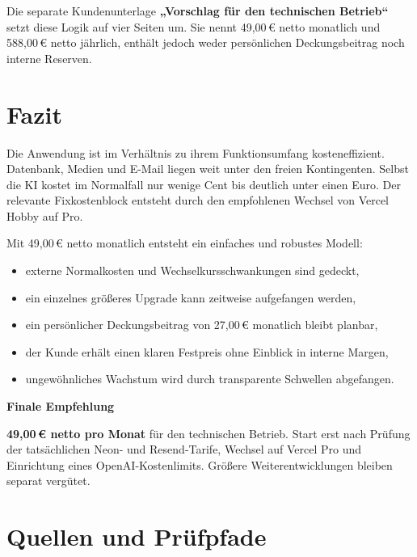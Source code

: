 \documentclass[11pt,a4paper]{article}
\newcommand{\eur}[1]{#1\,€}
\begin{document}
\begin{decisionbox}
  Die separate Kundenunterlage \textbf{„Vorschlag für den technischen Betrieb“} setzt diese Logik auf vier Seiten um. Sie nennt \eur{49,00} netto monatlich und \eur{588,00} netto jährlich, enthält jedoch weder persönlichen Deckungsbeitrag noch interne Reserven.
\end{decisionbox}

\section{Fazit}

Die Anwendung ist im Verhältnis zu ihrem Funktionsumfang kosteneffizient. Datenbank, Medien und E-Mail liegen weit unter den freien Kontingenten. Selbst die KI kostet im Normalfall nur wenige Cent bis deutlich unter einen Euro. Der relevante Fixkostenblock entsteht durch den empfohlenen Wechsel von Vercel Hobby auf Pro.

Mit \eur{49,00} netto monatlich entsteht ein einfaches und robustes Modell:

\begin{itemize}
  \item externe Normalkosten und Wechselkursschwankungen sind gedeckt,
  \item ein einzelnes größeres Upgrade kann zeitweise aufgefangen werden,
  \item ein persönlicher Deckungsbeitrag von \eur{27,00} monatlich bleibt planbar,
  \item der Kunde erhält einen klaren Festpreis ohne Einblick in interne Margen,
  \item ungewöhnliches Wachstum wird durch transparente Schwellen abgefangen.
\end{itemize}

\begin{decisionbox}
  {\sffamily\Large\bfseries\color{NordNavy}Finale Empfehlung}

  \textbf{\eur{49,00} netto pro Monat} für den technischen Betrieb. Start erst nach Prüfung der tatsächlichen Neon- und Resend-Tarife, Wechsel auf Vercel Pro und Einrichtung eines OpenAI-Kostenlimits. Größere Weiterentwicklungen bleiben separat vergütet.
\end{decisionbox}

\newpage
\section*{Quellen und Prüfpfade}
\end{document}
